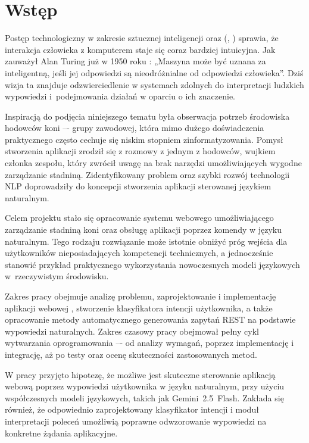 \chapter{Wstęp}
\label{chapters:01-wstep}

Postęp technologiczny w zakresie sztucznej inteligencji oraz  (, ) sprawia, że interakcja człowieka z komputerem staje się coraz bardziej intuicyjna. Jak zauważył Alan Turing już w 1950 roku \cite{turing1950}: „Maszyna może być uznana za inteligentną, jeśli jej odpowiedzi są nieodróżnialne od odpowiedzi człowieka”. Dziś wizja ta znajduje odzwierciedlenie w systemach zdolnych do interpretacji ludzkich wypowiedzi i~podejmowania działań w oparciu o ich znaczenie.

Inspiracją do podjęcia niniejszego tematu była obserwacja potrzeb środowiska hodowców koni –- grupy zawodowej, która mimo dużego doświadczenia praktycznego często cechuje się niskim stopniem zinformatyzowania. Pomysł stworzenia aplikacji zrodził się z rozmowy z jednym z hodowców, wujkiem członka zespołu, który zwrócił uwagę na brak narzędzi umożliwiających wygodne zarządzanie stadniną. Zidentyfikowany problem oraz szybki rozwój technologii NLP doprowadziły do koncepcji stworzenia aplikacji sterowanej językiem naturalnym.

Celem projektu stało się opracowanie systemu webowego umożliwiającego zarządzanie stadniną koni oraz obsługę aplikacji poprzez komendy w języku naturalnym. Tego rodzaju rozwiązanie może istotnie obniżyć próg wejścia dla użytkowników nieposiadających kompetencji technicznych, a jednocześnie stanowić przykład praktycznego wykorzystania nowoczesnych modeli językowych w~rzeczywistym środowisku.

Zakres pracy obejmuje analizę problemu, zaprojektowanie i implementację aplikacji webowej , stworzenie klasyfikatora intencji użytkownika, a także opracowanie metody automatycznego generowania zapytań REST na podstawie wypowiedzi naturalnych. Zakres czasowy pracy obejmował pełny cykl wytwarzania oprogramowania –- od analizy wymagań, poprzez implementację i integrację, aż po testy oraz ocenę skuteczności zastosowanych metod.

W pracy przyjęto hipotezę, że możliwe jest skuteczne sterowanie aplikacją webową poprzez wypowiedzi użytkownika w języku naturalnym, przy użyciu współczesnych modeli językowych, takich jak Gemini~2.5~Flash. Zakłada się również, że odpowiednio zaprojektowany klasyfikator intencji i moduł interpretacji poleceń umożliwią poprawne odwzorowanie wypowiedzi na konkretne żądania aplikacyjne.

